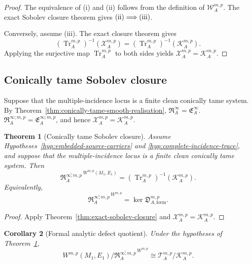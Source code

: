 \documentclass[11pt]{article}
\theoremstyle{plain}
\newtheorem{theorem}{Theorem}[section]
\newtheorem{corollary}[theorem]{Corollary}
\theoremstyle{definition}
\begin{document}
\begin{proof}
The equivalence of \textup{(i)} and \textup{(ii)} follows from the
definition of \(\mathcal W_A^{m,p}\). The exact Sobolev closure theorem
gives
\(\textup{(ii)} \Longrightarrow \textup{(iii)}\).

Conversely, assume \textup{(iii)}. The exact closure theorem gives
\[
  \left(
    \operatorname{Tr}_A^{m,p}
  \right)^{-1}
  \left(
    \mathcal X_A^{m,p}
  \right)
  =
  \left(
    \operatorname{Tr}_A^{m,p}
  \right)^{-1}
  \left(
    \mathcal K_A^{m,p}
  \right).
\]
Applying the surjective map
\(\operatorname{Tr}_A^{m,p}\) to both sides yields
\(\mathcal X_A^{m,p} = \mathcal K_A^{m,p}\).
\end{proof}

\subsection{Conically tame Sobolev closure}
\label{subsec:conically-tame-sobolev-closure}

Suppose that the multiple-incidence locus is a finite clean conically
tame system. By
Theorem~\ref{thm:conically-tame-smooth-realisation},
\(\mathfrak R_A^\infty = \mathfrak E_A^\infty\).
\(\mathfrak R_A^{\infty;m,p} = \mathfrak E_A^{\infty;m,p}\),
and hence
\(\mathcal X_A^{m,p} = \mathcal K_A^{m,p}\).

\begin{theorem}[Conically tame Sobolev closure]
\label{thm:conically-tame-sobolev-closure}
Assume
Hypotheses~\ref{hyp:embedded-source-carriers}
and \ref{hyp:complete-incidence-trace}, and suppose that the
multiple-incidence locus is a finite clean conically tame system. Then
\[
  \boxed{
  \overline{
    \mathfrak R_A^{\infty;m,p}
  }^{\,W^{m,p}(M_1,E_1)}
  =
  \left(
    \operatorname{Tr}_A^{m,p}
  \right)^{-1}
  \left(
    \mathcal K_A^{m,p}
  \right).
  }
\]
Equivalently,
\[
  \overline{
    \mathfrak R_A^{\infty;m,p}
  }^{\,W^{m,p}}
  =
  \ker
  \mathfrak D_{A,\mathrm{form}}^{m,p}.
\]
\end{theorem}

\begin{proof}
Apply
Theorem~\ref{thm:exact-sobolev-closure}
and
\(\mathcal X_A^{m,p} = \mathcal K_A^{m,p}\).
\end{proof}

\begin{corollary}[Formal analytic defect quotient]
\label{cor:formal-analytic-defect-quotient}
Under the hypotheses of
Theorem~\ref{thm:conically-tame-sobolev-closure},
\[
  W^{m,p}(M_1,E_1)
  \Big/
  \overline{
    \mathfrak R_A^{\infty;m,p}
  }^{\,W^{m,p}}
  \cong
  \mathcal T_A^{m,p}/\mathcal K_A^{m,p}.
\]
\end{corollary}
\end{document}
